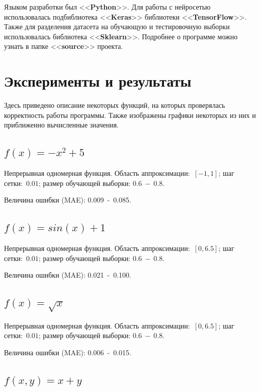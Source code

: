 \documentclass[12pt, a4paper]{article}
\begin{document}
    Языком разработки был <<\textbf{Python}>>. Для работы с нейросетью 
    использовалась подбиблиотека <<\textbf{Keras}>> библиотеки 
    <<\textbf{TensorFlow}>>. Также для разделения датасета на обучающую и 
    тестировочную выборки использовалась библиотека <<\textbf{Sklearn}>>. 
    Подробнее о программе можно узнать в папке <<\textbf{source}>> проекта.
    
    \section{Эксперименты и результаты}
    
    Здесь приведено описание некоторых функций, на которых проверялась 
    корректность работы программы. Также изображены графики некоторых из них 
    и приближенно вычисленные значения.
    
    \subsection{$f(x) = - x^2 + 5$}
    
    Непрерывная одномерная функция. Область аппроксимации:~$[-1, 1]$; шаг 
    сетки:~$0.01$; размер обучающей выборки: $0.6~-~0.8$.
    
    Величина ошибки (MAE): 0.009~-~0.085.
    
    \subsection{$f(x) = sin(x) + 1$}
    
    Непрерывная одномерная функция. Область аппроксимации:~$[0, 6.5]$; шаг 
    сетки:~$0.01$; размер обучающей выборки: $0.6~-~0.8$.
    
    Величина ошибки (MAE): 0.021~-~0.100.
    
    \subsection{$f(x) = \sqrt{x}$}
    
    Непрерывная одномерная функция. Область аппроксимации:~$[0, 6.5]$; шаг 
    сетки:~$0.01$; размер обучающей выборки: $0.6~-~0.8$.
    
    Величина ошибки (MAE): 0.006~-~0.015.
    
    \subsection{$f(x, y) = x + y$}
    
\end{document}
